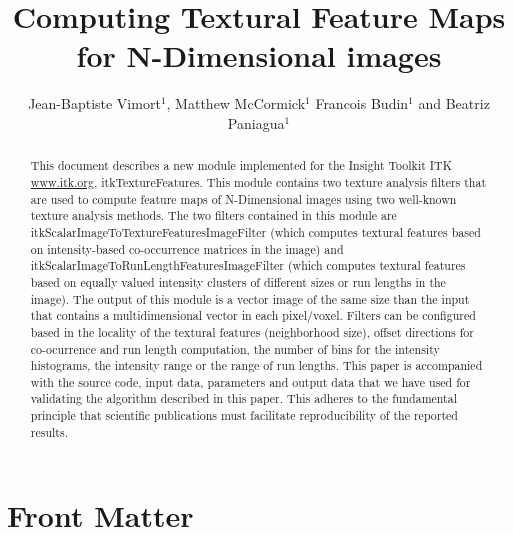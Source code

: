 \documentclass{InsightArticle}
\title{Computing Textural Feature Maps for N-Dimensional images}
\author{Jean-Baptiste Vimort$^{1}$, Matthew McCormick$^{1}$ Francois Budin$^{1}$ and Beatriz Paniagua$^{1}$}
\newcommand{\IJhandlerIDnumber}{1338}
\begin{document}
%
%
\IJhandlefooter{\IJhandlerIDnumber}


\ifpdf
\else
\fi


\maketitle


\ifhtml
\chapter*{Front Matter\label{front}}
\fi


\begin{abstract}
\noindent
This document describes a new module implemented for the Insight Toolkit ITK
  \url{www.itk.org}, itkTextureFeatures. This module contains two texture analysis filters that are used to compute feature maps of N-Dimensional images using two well-known texture analysis methods. The two filters contained in this module are itkScalarImageToTextureFeaturesImageFilter (which computes textural features based on intensity-based co-occurrence matrices in the image) and itkScalarImageToRunLengthFeaturesImageFilter (which computes textural features based on equally valued intensity clusters of different sizes or run lengths in the image). The output of this module is a vector image of the same size than the input that contains a multidimensional vector in each pixel/voxel. Filters can be configured based in the locality of the textural features (neighborhood size), offset directions for co-ocurrence and run length computation, the number of bins for the intensity histograms, the intensity range or the range of run lengths. This paper is accompanied with the source code, input data, parameters and output data that we have used for validating the algorithm described in this paper. This adheres to the fundamental principle that scientific publications must facilitate reproducibility of the reported results.

\end{abstract}
\end{document}
